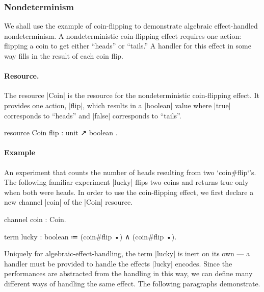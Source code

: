 \subsubsection{Nondeterminism}
\label{sec:aeh-nondeterminism}

We shall use the example of coin-flipping to demonstrate algebraic effect-handled nondeterminism.
A nondeterministic coin-flipping effect requires one action: flipping a coin to get either ``heads'' or ``tails.''
A handler for this effect in some way fills in the result of each coin flip.

\paragraph{Resource.}
%
The resource \code|Coin| is the resource for the nondeterministic coin-flipping effect.
It provides one action, \code|flip|, which results in a \code|boolean| value where \code|true| corresponds to ``heads'' and \code|false| corresponds to ``tails''.
%
\begin{program}[caption={Resource for nondeterministic coin-flipping}]
resource Coin { flip : unit ↗ boolean }.
\end{program}

\paragraph{Example}
%
An experiment that counts the number of heads resulting from two \code`coin#flip`'s.
The following familiar experiment \code|lucky| flips two coins and returns true only when both were heads.
In order to use the coin-flipping effect, we first declare a new channel \code|coin| of the \code|Coin| resource.
%
\begin{snippet}
channel coin : Coin.

term lucky : boolean ≔ (coin#flip •) ∧ (coin#flip •).
\end{snippet}
%
Uniquely for algebraic-effect-handling, the term \code|lucky| is inert on its own --- a handler must be provided to handle the effects \code|lucky| encodes.
Since the performances are abstracted from the handling in this way, we can define many different ways of handling the same effect.
The following paragraphs demonstrate.

